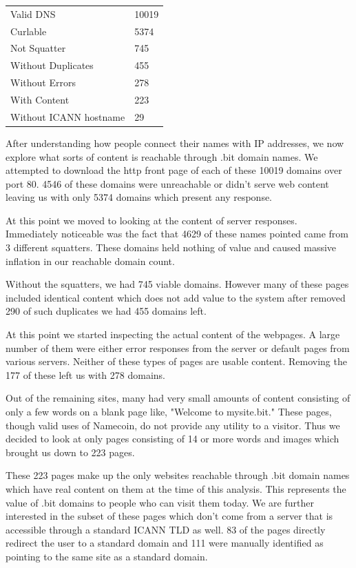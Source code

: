 \begin{table}[t]
\begin{tabular}{ll}
Valid DNS          &  10019  \\
Curlable        & 5374     \\
Not Squatter        & 745     \\
Without Duplicates      & 455     \\
Without Errors              & 278    \\
With Content              & 223    \\
Without ICANN hostname   & 29   \\
\end{tabular}
\end{table}

After understanding how people connect their names with IP addresses, we now explore what sorts of content is reachable through .bit domain names. We attempted to download the http front page of each of these 10019 domains over port 80. 4546 of these domains were unreachable or didn't serve web content leaving us with only 5374 domains which present any response.

At this point we moved to looking at the content of server responses. Immediately noticeable was the fact that 4629 of these names pointed came from 3 different squatters. These domains held nothing of value and caused massive inflation in our reachable domain count.

Without the squatters, we had 745 viable domains. However many of these pages included identical content which does not add value to the system after removed 290 of such duplicates we had 455 domains left.

At this point we started inspecting the actual content of the webpages. A large number of them were either error responses from the server or default pages from various servers. Neither of these types of pages are usable content. Removing the 177 of these left us with 278 domains.

Out of the remaining sites, many had very small amounts of content consisting of only a few words on a blank page like, "Welcome to mysite.bit." These pages, though valid uses of Namecoin, do not provide any utility to a visitor. Thus we decided to look at only pages consisting of 14 or more words and images which brought us down to 223 pages.

These 223 pages make up the only websites reachable through .bit domain names which have real content on them at the time of this analysis. This represents the value of .bit domains to people who can visit them today. We are further interested in the subset of these pages which don't come from a server that is accessible through a standard ICANN TLD as well.  83 of the pages directly redirect the user to a standard domain and 111 were manually identified as pointing to the same site as a standard domain.

